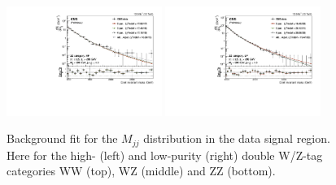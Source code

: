\begin{figure}[htb]
\includegraphics[width=0.45\textwidth]{figures/analysis/search2/AN-16-235/plots/ZZHP.pdf}
\includegraphics[width=0.45\textwidth]{figures/analysis/search2/AN-16-235/plots/ZZLP.pdf}
\caption{Background fit for the $M_{jj}$ distribution in the data signal region. Here for the high- (left) and low-purity (right) double W/Z-tag categories WW (top), WZ (middle) and ZZ (bottom).}
\label{fig:bkgfit_sr_vv}
\end{figure}




